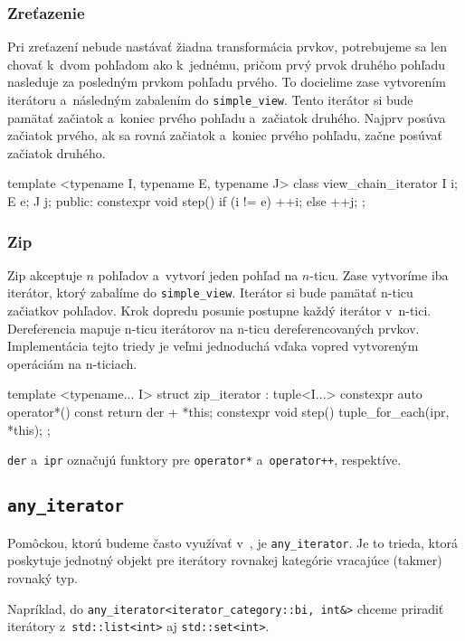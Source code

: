 \subsubsection{Zreťazenie}

Pri zreťazení nebude nastávať žiadna transformácia prvkov, potrebujeme sa len chovať k~dvom pohľadom ako k~jednému, pričom prvý prvok druhého pohľadu nasleduje za posledným prvkom pohľadu prvého. To docielime zase vytvorením iterátoru a~následným zabalením do \texttt{simple\_view}. Tento iterátor si bude pamätať začiatok a~koniec prvého pohľadu a~začiatok druhého. Najprv posúva začiatok prvého, ak sa rovná začiatok a~koniec prvého pohľadu, začne posúvať začiatok druhého.
\begin{code}
template <typename I, typename E, typename J>
class view_chain_iterator
{   I i; E e; J j;
public:
    constexpr void step()
    {   if (i != e) ++i;
        else        ++j; }
};
\end{code}

\subsubsection{Zip}

Zip akceptuje $n$ pohľadov a~vytvorí jeden pohľad na $n$-ticu. Zase vytvoríme iba iterátor, ktorý zabalíme do \texttt{simple\_view}. Iterátor si bude pamätať n-ticu začiatkov pohľadov. Krok dopredu posunie postupne každý iterátor v~n-tici. Dereferencia mapuje n-ticu iterátorov na n-ticu dereferencovaných prvkov. Implementácia tejto triedy je veľmi jednoduchá vďaka vopred vytvoreným operáciám na n-ticiach.
\begin{code}
template <typename... I>
struct zip_iterator : tuple<I...>
{   constexpr auto operator*() const { return der + *this; }
    constexpr void step() { tuple_for_each(ipr, *this); }
};
\end{code}
\texttt{der} a~\texttt{ipr} označujú funktory pre \texttt{operator*} a~\texttt{operator++}, respektíve.

\subsection{\texttt{any\_iterator}}

Pomôckou, ktorú budeme často využívať v~\PPreflection{}, je \texttt{any\_iterator}. Je to trieda, ktorá poskytuje jednotný objekt pre iterátory rovnakej kategórie vracajúce (takmer) rovnaký typ.

Napríklad, do \texttt{any\_iterator<iterator\_category::bi, int\&>} chceme priradiť iterátory z~\texttt{std::list<int>} aj \texttt{std::set<int>}.

